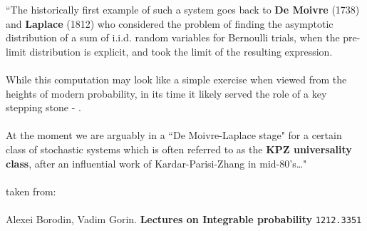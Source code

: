 \documentclass[12pt]{article}
\begin{document}
\newpage

\newpage

\selectfont \fontsize{20}{20}\selectfont

``The historically first example of such a system goes back to \textbf{De Moivre} (1738) and
\textbf{Laplace} (1812) who considered the problem of finding the asymptotic distribution of a sum
of i.i.d. random variables for Bernoulli trials, when the pre-limit distribution is explicit,
and took the limit of the resulting expression. \\ \\ 
\indent While this computation may look like a
simple exercise when viewed from the heights of modern probability, in its time it likely
served the role of a key stepping stone - {\color{blue!50!white!80!black}{first rigorous proofs of central limit theorems
appeared only in the beginning of the XXth century}}. \\ \\
\indent At the moment we are arguably in a ``De Moivre-Laplace stage" for a certain class
of stochastic systems which is often referred to as the \textbf{KPZ universality class}, after an
influential work of Kardar-Parisi-Zhang in mid-80's\dots" \\ \\

\selectfont \fontsize{25}{30}\selectfont
\noindent taken from: \\ \\
\selectfont \fontsize{20}{15}\selectfont
Alexei Borodin, Vadim Gorin.  \textbf{Lectures on Integrable probability} \texttt{1212.3351}
\end{document}
